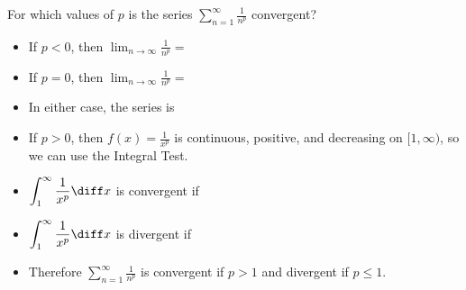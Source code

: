 \begin{frame}
\begin{example}[Example 2, p. 735]
For which values of $p$ is the series $\displaystyle \sum_{n=1}^\infty \frac{1}{n^p}$ convergent?
\begin{itemize}
\item<2-| alert@2-3>  If $p < 0$, then $\lim_{n\to\infty}\frac{1}{n^p} = $
\item<4-| alert@4-5>  If $p = 0$, then $\lim_{n\to\infty}\frac{1}{n^p} = $
\item<6-| alert@6-7>  In either case, the series is 
\item<8->  If $p > 0$, then $f(x) = \frac{1}{x^p}$ is continuous, positive, and decreasing on $[1, \infty)$, so we can use the Integral Test.
\item<9->  $\displaystyle \int_1^\infty \frac{1}{x^p}\diff x$ is \alert<handout:0| 9-10>{convergent if }
\item<9->  $\displaystyle \int_1^\infty \frac{1}{x^p}\diff x$ is \alert<handout:0| 11-12>{divergent if }
\item<13->  Therefore $\displaystyle \sum_{n=1}^\infty \frac{1}{n^p}$ is convergent if $p > 1$ and divergent if $p \leq 1$.
\end{itemize}
\end{example}
\end{frame}
